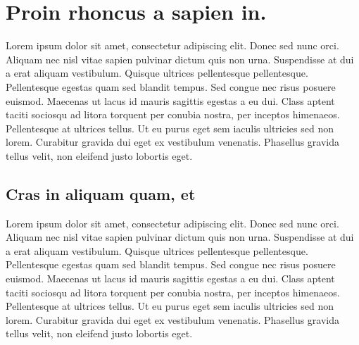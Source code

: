%
%
%
%

\chapter{Proin rhoncus a sapien in.}
\label{cha:789} Lorem ipsum dolor sit amet, consectetur adipiscing elit. Donec sed
nunc orci. Aliquam nec nisl vitae sapien pulvinar dictum quis non urna. Suspendisse
at dui a erat aliquam vestibulum. Quisque ultrices pellentesque pellentesque. Pellentesque
egestas quam sed blandit tempus. Sed congue nec risus posuere euismod. Maecenas ut
lacus id mauris sagittis egestas a eu dui. Class aptent taciti sociosqu ad
litora torquent per conubia nostra, per inceptos himenaeos. Pellentesque at
ultrices tellus. Ut eu purus eget sem iaculis ultricies sed non lorem. Curabitur
gravida dui eget ex vestibulum venenatis. Phasellus gravida tellus velit, non
eleifend justo lobortis eget.

\section{Cras in aliquam quam, et}
\label{sec:456} Lorem ipsum dolor sit amet, consectetur adipiscing elit. Donec
sed nunc orci. Aliquam nec nisl vitae sapien pulvinar dictum quis non urna.
Suspendisse at dui a erat aliquam vestibulum. Quisque ultrices pellentesque pellentesque.
Pellentesque egestas quam sed blandit tempus. Sed congue nec risus posuere euismod.
Maecenas ut lacus id mauris sagittis egestas a eu dui. Class aptent taciti sociosqu
ad litora torquent per conubia nostra, per inceptos himenaeos. Pellentesque at ultrices
tellus. Ut eu purus eget sem iaculis ultricies sed non lorem. Curabitur gravida dui
eget ex vestibulum venenatis. Phasellus gravida tellus velit, non eleifend justo
lobortis eget.

